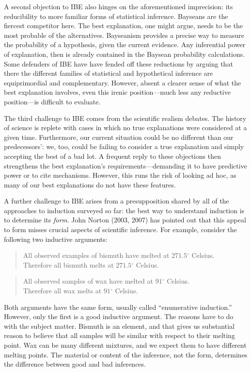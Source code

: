 \documentclass{article}[11pt]
\renewcommand{\degree}{\ensuremath{^\circ}}
\begin{document}
A second objection to IBE also hinges on the aforementioned imprecision: its reducibility to more familiar forms of statistical inference.  Bayseans are the fiercest competitor here.  The best explanation, one might argue, needs to be the most probable of the alternatives.  Bayseanism provides a precise way to measure the probability of a hypothesis, given the current evidence.  Any inferential power of explanation, then is already contained in the Baysean probability calculations.  Some defenders of IBE have have fended off these reductions by arguing that there the different families of statistical and hypothetical inference are equiprimordial and complementary. However, absent a clearer sense of what the best explanation involves, even this irenic position---much less any reductive position---is difficult to evaluate.

The third challenge to IBE comes from the scientific realism debates. The history of science is replete with cases in which no true explanations were considered at a given time. Furthermore, our current situation could be no different than our predecessors’: we, too, could be failing to consider a true explanation and simply accepting the best of a bad lot. A frequent reply to these objections then strengthens the best explanation's requirements---demanding it to have predictive power or to cite mechanisms. However, this runs the risk of looking ad hoc, as many of our best explanations do not have these features.

A further challenge to IBE arises from a presupposition shared by all of the approaches to induction surveyed so far: the best way to understand induction is to determine its \textit{form}. John Norton (2003, 2007) has pointed out that this appeal to form misses crucial aspects of scientific inference.  For example, consider the following two inductive arguments:

\begin{quote} 
All observed examples of bismuth have melted at $271.5\degree$ Celsius. \\[-6pt] Therefore all bismuth melts at $271.5\degree$ Celsius.
\end{quote}

\begin{quote}
All observed samples of wax have melted at $91\degree$ Celsius. \\[-6pt]
Therefore all wax melts at $91\degree$ Celsius.
\end{quote}

\noindent Both arguments have the same form, usually called ``enumerative induction.''  However, only the first is a good inductive argument.  The reasons have to do with the subject matter.  Bismuth is an element, and that gives us substantial reason to believe that all samples will be similar with respect to their melting point.  Wax can be many different mixtures, and we expect them to have different melting points.  The material or content of the inference, not the form, determines the difference between good and bad inferences.
\end{document}
